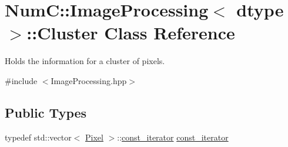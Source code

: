 \hypertarget{class_num_c_1_1_image_processing_1_1_cluster}{}\section{NumC\+:\+:Image\+Processing$<$ dtype $>$\+:\+:Cluster Class Reference}
\label{class_num_c_1_1_image_processing_1_1_cluster}


Holds the information for a cluster of pixels.  




{\ttfamily \#include $<$Image\+Processing.\+hpp$>$}

\subsection*{Public Types}
\begin{DoxyCompactItemize}
\item 
typedef std\+::vector$<$ \mbox{\hyperlink{class_num_c_1_1_image_processing_1_1_pixel}{Pixel}} $>$\+::\mbox{\hyperlink{class_num_c_1_1_image_processing_1_1_cluster_a15d2f9ebeba9062779e57a6fdce9faa0}{const\+\_\+iterator}} \mbox{\hyperlink{class_num_c_1_1_image_processing_1_1_cluster_a15d2f9ebeba9062779e57a6fdce9faa0}{const\+\_\+iterator}}
\end{DoxyCompactItemize}
